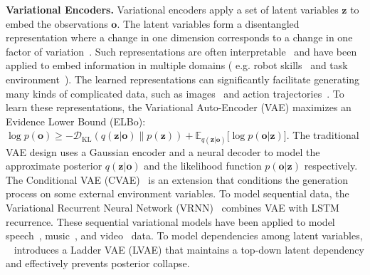 \documentclass[letterpaper]{article} %
\newcommand{\latentvariables}{\mathbf{z}}
\newcommand{\inference}{q}
\newcommand{\generation}{p}
\newcommand{\observation}{\boldsymbol{o}}
\newcommand{\system}{VaRLAE\;}
\begin{document}
{\bf Variational Encoders.} Variational encoders apply a set of latent variables $\latentvariables$ to embed the observations $\observation$. The latent variables form a disentangled representation where a change in one dimension corresponds to a change in one factor of variation~\cite{BengioRepresentation13}. Such representations are often interpretable~\cite{KimM18,Higgins17BetaVAE} and have been applied to embed information in multiple domains ( e.g. robot skills~\cite{HausmanEmbedSkills18} and task environment~\cite{zintgraf2019variational}).
The learned representations can significantly facilitate generating many kinds of complicated data, such as images~\cite{kingma2013auto,WalkerDGH16} and action trajectories~\cite{Zhan19basketballvrnn,Sun19basketballvrnn}. To learn these representations, the Variational Auto-Encoder (VAE) maximizes an Evidence Lower Bound (ELBo): $\log p(\observation) \geq -\mathcal{D}_{\text{KL}}(\inference(\latentvariables|\observation)\| p(\latentvariables))+\mathbb{E}_{\inference(\latentvariables|\observation)}\Big[\log\generation(\observation|\latentvariables)\Big]$. The traditional VAE design uses 
a Gaussian encoder and a neural decoder to model the approximate posterior $\inference(\latentvariables|\observation)$ and the likelihood function $\generation(\observation|\latentvariables)$ respectively. 
The Conditional VAE (CVAE)~\cite{WalkerDGH16} is an extension that conditions the generation process on some external environment variables. To model sequential data, the Variational Recurrent Neural Network (VRNN)~\cite{ChungKDGCB15}  combines VAE with LSTM recurrence. These sequential variational models have been applied to model speech~\cite{Fraccaro2016SNN}, music~\cite{RobertsERHE18}, and video~\cite{Castrejon2019VRNNVideo} data. To model dependencies among latent variables, ~\cite{SonderbyLadderVAE16} introduces a Ladder VAE (LVAE) that maintains a top-down latent dependency and effectively prevents posterior collapse.

\end{document}
